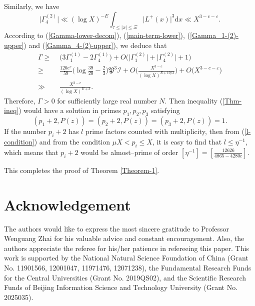 \documentclass[a4paper,oneside,11pt]{article}%
\numberwithin{equation}{section}
\begin{document}
Similarly, we have
\begin{equation}\label{Gamma_4-(2)-upper}
\big|\Gamma_4^{(2)}\big|\ll (\log X)^{-E}\int_{\tau\leqslant|x|\leqslant\Xi}\big|L^+(x)\big|^3\mathrm{d}x
\ll X^{3-c-\varepsilon}.
\end{equation}
According to (\ref{Gamma-lower-decom}), (\ref{main-term-lower}), (\ref{Gamma_1-(2)-upper}) and (\ref{Gamma_4-(2)-upper}),
we deduce that
\begin{align*}
            \Gamma
\geqslant & \,\, \Big(3\Gamma_1^{(1)}-2\Gamma_4^{(1)}\Big)+O\Big(\Big|\Gamma_1^{(2)}\Big|+\Big|\Gamma_4^{(2)}\Big|+1\Big)
                    \nonumber \\
\geqslant & \,\, \frac{120e^\gamma}{59}\bigg(\log\frac{39}{20}-\frac{2}{3}\bigg)\mathfrak{P}^3\mathcal{I}
                 +O\bigg(\frac{X^{3-c}}{(\log X)^{E+10/3}}\bigg)+O\big(X^{3-c-\varepsilon}\big)
                    \nonumber \\
\gg & \,\, \frac{X^{3-c}}{(\log X)^{E+3}}.
\end{align*}
Therefore, $\Gamma>0$ for sufficiently large real number $N$. Then inequality (\ref{Thm-ineq}) would have a solution in primes $p_1,p_2,p_3$ satisfying
\begin{equation}\label{l-condition}
(p_1+2,P(z))=(p_2+2,P(z))=(p_3+2,P(z))=1.
\end{equation}
If the number $p_i+2$ has $l$ prime factors counted with multiplicity, then from (\ref{l-condition}) and from the condition
$\mu X<p_i\leqslant X$, it is easy to find that $l\leqslant\eta^{-1}$, which means that $p_i+2$ would be almost--prime of order
$[\eta^{-1}]=[\frac{12626}{4865-4280c}]$.






This completes the proof of Theorem \ref{Theorem-1}.




\section*{Acknowledgement}


The authors would like to express the most sincere gratitude to Professor Wenguang Zhai for
his valuable advice and constant encouragement. Also, the authors appreciate the referee for
his/her patience in refereeing this paper. This work is supported by the National Natural Science
Foundation of China (Grant No. 11901566, 12001047, 11971476, 12071238), the Fundamental Research
Funds for the Central Universities (Grant No. 2019QS02), and the Scientific Research Funds of
Beijing Information Science and Technology University (Grant No. 2025035).
\end{document}

